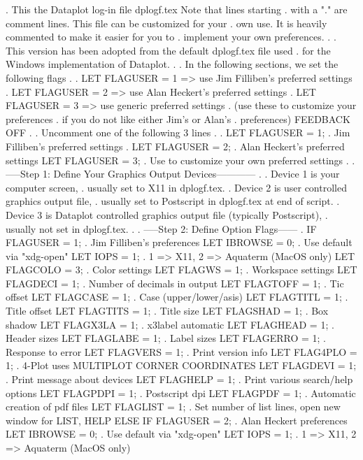 .  This the Dataplot log-in file dplogf.tex  Note that lines starting
.  with a "." are comment lines.  This file can be customized for your
.  own use.  It is heavily commented to make it easier for you to
.  implement your own preferences.
.
.  This version has been adopted from the default dplogf.tex file used
.  for the Windows implementation of Dataplot.
.
.  In the following sections, we set the following flags
.
.     LET FLAGUSER = 1  => use Jim Filliben's preferred settings
.     LET FLAGUSER = 2  => use Alan Heckert's preferred settings
.     LET FLAGUSER = 3  => use generic preferred settings
.                          (use these to customize your preferences
.                          if you do not like either Jim's or Alan's
.                          preferences)
FEEDBACK OFF
.
.  Uncomment one of the following 3 lines
.
. LET FLAGUSER = 1; . Jim Filliben's preferred settings
. LET FLAGUSER = 2; . Alan Heckert's preferred settings
LET FLAGUSER = 3; . Use to customize your own preferred settings
.
. -----Step 1: Define Your Graphics Output Devices------------
.
. Device 1 is your computer screen,
.          usually set to X11 in dplogf.tex.
. Device 2 is user controlled graphics output file,
.          usually set to Postscript in dplogf.tex at end of script.
. Device 3 is Dataplot controlled graphics output file (typically Postscript),
.          usually not set in dplogf.tex.
.
. -----Step 2: Define Option Flags------
.
IF FLAGUSER = 1;      . Jim Filliben's preferences
   LET IBROWSE = 0;   . Use default via "xdg-open"
   LET IOPS = 1;      . 1 => X11, 2 => Aquaterm (MacOS only)
   LET FLAGCOLO = 3;  . Color settings
   LET FLAGWS = 1;    . Workspace settings
   LET FLAGDECI = 1;  . Number of decimals in output
   LET FLAGTOFF = 1;  . Tic offset
   LET FLAGCASE = 1;  . Case (upper/lower/asis)
   LET FLAGTITL = 1;  . Title offset
   LET FLAGTITS = 1;  . Title size
   LET FLAGSHAD = 1;  . Box shadow
   LET FLAGX3LA = 1;  . x3label automatic
   LET FLAGHEAD = 1;  . Header sizes
   LET FLAGLABE = 1;  . Label sizes
   LET FLAGERRO = 1;  . Response to error
   LET FLAGVERS = 1;  . Print version info
   LET FLAG4PLO = 1;  . 4-Plot uses MULTIPLOT CORNER COORDINATES
   LET FLAGDEVI = 1;  . Print message about devices
   LET FLAGHELP = 1;  . Print various search/help options
   LET FLAGPDPI = 1;  . Postscript dpi
   LET FLAGPDF  = 1;  . Automatic creation of pdf files
   LET FLAGLIST = 1;  . Set number of list lines, open new window for LIST, HELP
ELSE IF FLAGUSER = 2; . Alan Heckert preferences
   LET IBROWSE = 0;   . Use default via "xdg-open"
   LET IOPS = 1;      . 1 => X11, 2 => Aquaterm (MacOS only)
